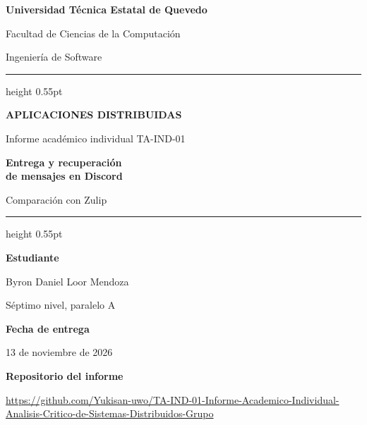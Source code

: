 \documentclass[11pt,a4paper]{article}
\begin{document}
\begin{titlepage}
  \raggedright
  \vspace*{0.5cm}
  {\large\bfseries Universidad Técnica Estatal de Quevedo\par}
  \vspace{0.35em}
  Facultad de Ciencias de la Computación\par
  Ingeniería de Software\par
  \vspace{1.4em}
  \hrule height 0.55pt

  \vspace{2.6cm}
  {\small\bfseries\MakeUppercase{Aplicaciones Distribuidas}\par}
  \vspace{0.4em}
  {\small Informe académico individual \enspace\textbar\enspace TA-IND-01\par}
  \vspace{1.4em}
  {\fontsize{29}{34}\selectfont\bfseries
    Entrega y recuperación\\
    de mensajes en Discord\par}
  \vspace{0.7em}
  {\Large Comparación con Zulip\par}

  \vfill
  \hrule height 0.55pt
  \vspace{1.35em}
  \noindent
  \begin{minipage}[t]{0.57\linewidth}
    {\small\bfseries Estudiante\par}
    \vspace{0.25em}
    {\large Byron Daniel Loor Mendoza\par}
    Séptimo nivel, paralelo A
  \end{minipage}\hfill
  \begin{minipage}[t]{0.38\linewidth}
    {\small\bfseries Fecha de entrega\par}
    \vspace{0.25em}
    13 de noviembre de 2026
  \end{minipage}\par
  \vspace{1.5em}
  {\small\bfseries Repositorio del informe\par}
  \vspace{0.25em}
  {\fontsize{7.5}{9}\selectfont\url{https://github.com/Yukisan-uwo/TA-IND-01-Informe-Academico-Individual-Analisis-Critico-de-Sistemas-Distribuidos-Grupo}\par}
  \vspace*{0.9cm}
\end{titlepage}
\end{document}
